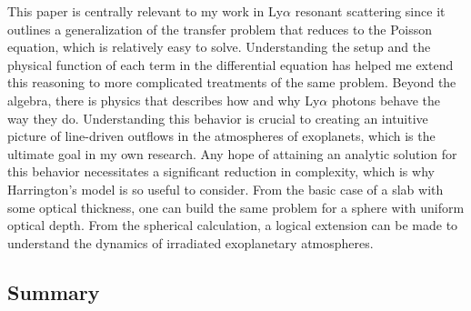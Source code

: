 \documentclass[onecolumn]{aastex63}
\begin{document}
This paper is centrally relevant to my work in Ly$\alpha$ resonant scattering since it outlines a generalization of the transfer problem that reduces to the Poisson equation, which is relatively easy to solve. Understanding the setup and the physical function of each term in the differential equation has helped me extend this reasoning to more complicated treatments of the same problem. Beyond the algebra, there is physics that describes how and why Ly$\alpha$ photons behave the way they do. Understanding this behavior is crucial to creating an intuitive picture of line-driven outflows in the atmospheres of exoplanets, which is the ultimate goal in my own research. Any hope of attaining an analytic solution for this behavior necessitates a significant reduction in complexity, which is why Harrington's model is so useful to consider. From the basic case of a slab with some optical thickness, one can build the same problem for a sphere with uniform optical depth. From the spherical calculation, a logical extension can be made to understand the dynamics of irradiated exoplanetary atmospheres.


\subsection{Summary}
\end{document}
